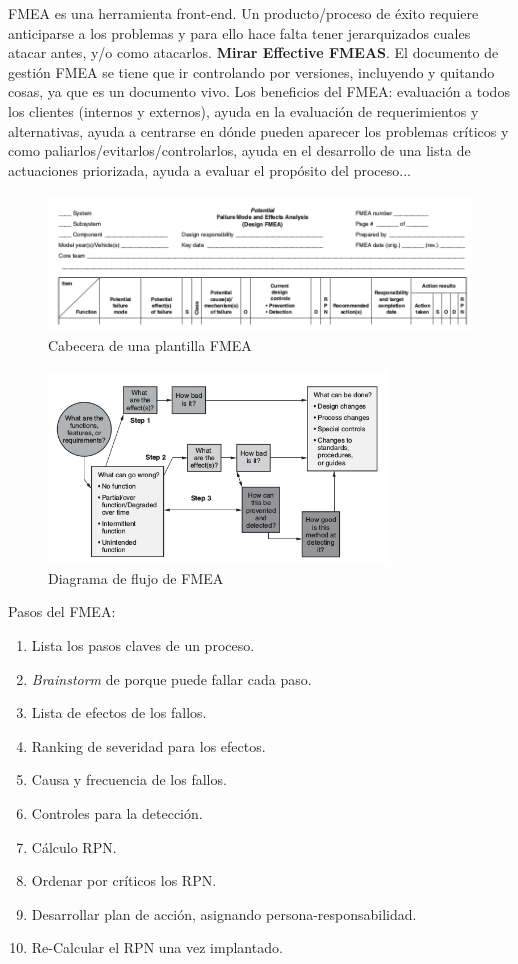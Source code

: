 \documentclass[oneside]{book}
\begin{document}
FMEA es una herramienta front-end. Un producto/proceso de éxito requiere anticiparse a los problemas y para ello hace falta tener jerarquizados cuales atacar antes, y/o como atacarlos. \textbf{Mirar Effective FMEAS}. El documento de gestión FMEA se tiene que ir controlando por versiones, incluyendo y quitando cosas, ya que es un documento vivo. Los beneficios del FMEA: evaluación a todos los clientes (internos y externos), ayuda en la evaluación de requerimientos y alternativas, ayuda a centrarse en dónde pueden aparecer los problemas críticos y como paliarlos/evitarlos/controlarlos, ayuda en el desarrollo de una lista de actuaciones priorizada, ayuda a evaluar el propósito del proceso...

\begin{figure}[ht!]
	\centering
	\includegraphics[width=170mm]{imagenes/PlantillaFMEA.png}
	\caption{Cabecera de una plantilla FMEA}
	\label{fig:PlantillaFMEA}
\end{figure}

\begin{figure}[ht!]
	\centering
	\includegraphics[width=90mm]{imagenes/FMEAFlowchart.png}
	\caption{Diagrama de flujo de FMEA}
	\label{fig:FMAFlowchart}
\end{figure}

Pasos del FMEA: \begin{enumerate} \item Lista los pasos claves de un proceso. \item \textit{Brainstorm} de porque puede fallar cada paso. \item Lista de efectos de los fallos. \item Ranking de severidad para los efectos. \item Causa y frecuencia de los fallos. \item Controles para la detección. \item Cálculo RPN. \item Ordenar por críticos los RPN. \item Desarrollar plan de acción, asignando persona-responsabilidad. \item Re-Calcular el RPN una vez implantado. \end{enumerate}
\end{document}
